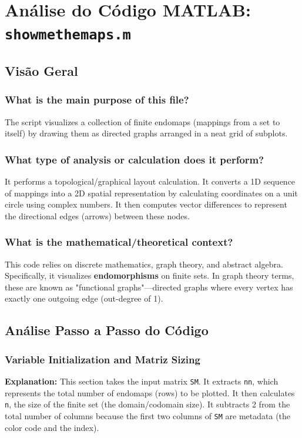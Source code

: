 
\chapter{Análise do Código MATLAB: \texttt{showmethemaps.m}}
\section{Visão Geral}

\subsection*{What is the main purpose of this file?}
The script visualizes a collection of finite endomaps (mappings from a set to itself) by drawing them as directed graphs arranged in a neat grid of subplots.

\subsection*{What type of analysis or calculation does it perform?}
It performs a topological/graphical layout calculation. It converts a 1D sequence of mappings into a 2D spatial representation by calculating coordinates on a unit circle using complex numbers. It then computes vector differences to represent the directional edges (arrows) between these nodes.

\subsection*{What is the mathematical/theoretical context?}
This code relies on discrete mathematics, graph theory, and abstract algebra. Specifically, it visualizes \textbf{endomorphisms} on finite sets. In graph theory terms, these are known as "functional graphs"—directed graphs where every vertex has exactly one outgoing edge (out-degree of 1).

\section{Análise Passo a Passo do Código}

\subsection{Variable Initialization and Matriz Sizing}
\textbf{Explanation:} This section takes the input matrix \texttt{SM}. It extracts \texttt{nn}, which represents the total number of endomaps (rows) to be plotted. It then calculates \texttt{n}, the size of the finite set (the domain/codomain size). It subtracts 2 from the total number of columns because the first two columns of \texttt{SM} are metadata (the color code and the index).

